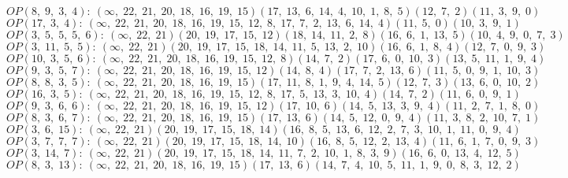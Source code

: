 $OP(8, \;9, \;3, \;4): \:(\infty, \;22, \;21, \;20, \;18, \;16, \;19, \;15)(17, \;13, \;6, \;14, \;4, \;10, \;1, \;8, \;5)(12, \;7, \;2)(11, \;3, \;9, \;0)$\\
$OP(17, \;3, \;4): \:(\infty, \;22, \;21, \;20, \;18, \;16, \;19, \;15, \;12, \;8, \;17, \;7, \;2, \;13, \;6, \;14, \;4)(11, \;5, \;0)(10, \;3, \;9, \;1)$\\
$OP(3, \;5, \;5, \;5, \;6): \:(\infty, \;22, \;21)(20, \;19, \;17, \;15, \;12)(18, \;14, \;11, \;2, \;8)(16, \;6, \;1, \;13, \;5)(10, \;4, \;9, \;0, \;7, \;3)$\\
$OP(3, \;11, \;5, \;5): \:(\infty, \;22, \;21)(20, \;19, \;17, \;15, \;18, \;14, \;11, \;5, \;13, \;2, \;10)(16, \;6, \;1, \;8, \;4)(12, \;7, \;0, \;9, \;3)$\\
$OP(10, \;3, \;5, \;6): \:(\infty, \;22, \;21, \;20, \;18, \;16, \;19, \;15, \;12, \;8)(14, \;7, \;2)(17, \;6, \;0, \;10, \;3)(13, \;5, \;11, \;1, \;9, \;4)$\\
$OP(9, \;3, \;5, \;7): \:(\infty, \;22, \;21, \;20, \;18, \;16, \;19, \;15, \;12)(14, \;8, \;4)(17, \;7, \;2, \;13, \;6)(11, \;5, \;0, \;9, \;1, \;10, \;3)$\\
$OP(8, \;8, \;3, \;5): \:(\infty, \;22, \;21, \;20, \;18, \;16, \;19, \;15)(17, \;11, \;8, \;1, \;9, \;4, \;14, \;5)(12, \;7, \;3)(13, \;6, \;0, \;10, \;2)$\\
$OP(16, \;3, \;5): \:(\infty, \;22, \;21, \;20, \;18, \;16, \;19, \;15, \;12, \;8, \;17, \;5, \;13, \;3, \;10, \;4)(14, \;7, \;2)(11, \;6, \;0, \;9, \;1)$\\
$OP(9, \;3, \;6, \;6): \:(\infty, \;22, \;21, \;20, \;18, \;16, \;19, \;15, \;12)(17, \;10, \;6)(14, \;5, \;13, \;3, \;9, \;4)(11, \;2, \;7, \;1, \;8, \;0)$\\
$OP(8, \;3, \;6, \;7): \:(\infty, \;22, \;21, \;20, \;18, \;16, \;19, \;15)(17, \;13, \;6)(14, \;5, \;12, \;0, \;9, \;4)(11, \;3, \;8, \;2, \;10, \;7, \;1)$\\
$OP(3, \;6, \;15): \:(\infty, \;22, \;21)(20, \;19, \;17, \;15, \;18, \;14)(16, \;8, \;5, \;13, \;6, \;12, \;2, \;7, \;3, \;10, \;1, \;11, \;0, \;9, \;4)$\\
$OP(3, \;7, \;7, \;7): \:(\infty, \;22, \;21)(20, \;19, \;17, \;15, \;18, \;14, \;10)(16, \;8, \;5, \;12, \;2, \;13, \;4)(11, \;6, \;1, \;7, \;0, \;9, \;3)$\\
$OP(3, \;14, \;7): \:(\infty, \;22, \;21)(20, \;19, \;17, \;15, \;18, \;14, \;11, \;7, \;2, \;10, \;1, \;8, \;3, \;9)(16, \;6, \;0, \;13, \;4, \;12, \;5)$\\
$OP(8, \;3, \;13): \:(\infty, \;22, \;21, \;20, \;18, \;16, \;19, \;15)(17, \;13, \;6)(14, \;7, \;4, \;10, \;5, \;11, \;1, \;9, \;0, \;8, \;3, \;12, \;2)$\\
